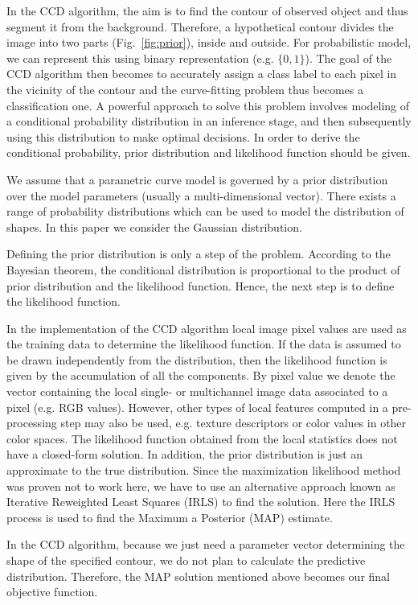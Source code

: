 \documentclass[conference]{IEEEtran}
\begin{document}
In the CCD algorithm, the aim is to find the contour of observed object
and thus segment it from the background. Therefore, a hypothetical 
contour divides the image into two parts (Fig.~\ref{fig:prior}), inside
and outside. For probabilistic model, we can represent this using
binary representation (e.g. $\{0, 1\}$). The goal of the CCD algorithm
then becomes to accurately assign a class label to each pixel in the vicinity of the
contour and the curve-fitting problem thus becomes a classification
one. A powerful approach to solve this problem involves modeling of a
conditional probability distribution in an inference stage, and then
subsequently using this distribution to make optimal decisions. In
order to derive the conditional probability, prior distribution and
likelihood function should be given.

We assume that a parametric curve model is governed by a prior distribution
over the model parameters (usually a multi-dimensional vector). There
exists a range of probability distributions which can be used to model
the distribution of shapes. In this paper we consider the Gaussian distribution.

Defining the prior distribution is only a step of the problem.
According to the Bayesian theorem, the conditional distribution
is proportional to the product of prior distribution and the likelihood
function. Hence, the next step is to define the likelihood function.

In the implementation of the CCD algorithm local image pixel values are used
as the training data to determine the likelihood function. If the data is 
assumed to be drawn independently from the distribution, then the likelihood 
function is given by the accumulation of all the components.
By pixel value we denote the vector containing the local single- or multichannel
image data associated to a pixel (e.g. RGB values). 
However, other types of local features computed in a pre-processing
step may also be used, e.g. texture descriptors or color values in
other color spaces. The likelihood function obtained from the local statistics does
not have a closed-form solution. In addition, the prior distribution is just
an approximate to the true distribution. Since the maximization
likelihood method was proven \cite{bishop2006pattern} not to work here, we have to use an alternative
approach known as Iterative Reweighted Least Squares (IRLS) to find
the solution. Here the IRLS process is used to find the Maximum a Posterior (MAP)
estimate.

In the CCD algorithm, because we just need a parameter vector determining
the shape of the specified contour, we do not plan to calculate the
predictive distribution. Therefore, the MAP solution mentioned above
becomes our final objective function.
\end{document}
